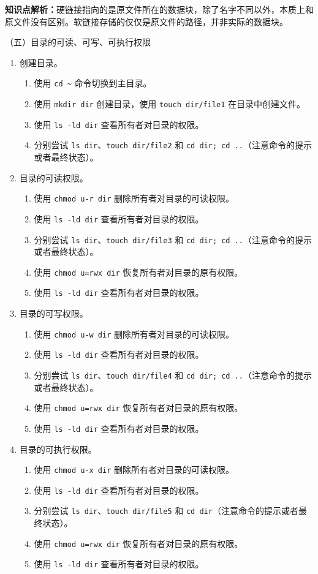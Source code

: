 \textbf{知识点解析：}硬链接指向的是原文件所在的数据块，除了名字不同以外，本质上和原文件没有区别。软链接存储的仅仅是原文件的路径，并非实际的数据块。

\vspace{0.1in}
（五）目录的可读、可写、可执行权限
\begin{enumerate}
  \item 创建目录。
    \begin{enumerate}
      \item 使用 \verb|cd ~| 命令切换到主目录。
      \item 使用 \verb|mkdir dir| 创建目录，使用 \verb|touch dir/file1| 在目录中创建文件。
      \item 使用 \verb|ls -ld dir| 查看所有者对目录的权限。
      \item 分别尝试 \verb|ls dir|、\verb|touch dir/file2| 和 \verb|cd dir; cd ..|（注意命令的提示或者最终状态）。
    \end{enumerate}
  \item 目录的可读权限。
    \begin{enumerate}
      \item 使用 \verb|chmod u-r dir| 删除所有者对目录的可读权限。
      \item 使用 \verb|ls -ld dir| 查看所有者对目录的权限。
      \item 分别尝试 \verb|ls dir|、\verb|touch dir/file3| 和 \verb|cd dir; cd ..|（注意命令的提示或者最终状态）。
      \item 使用 \verb|chmod u=rwx dir| 恢复所有者对目录的原有权限。
      \item 使用 \verb|ls -ld dir| 查看所有者对目录的权限。
    \end{enumerate}
  \item 目录的可写权限。
    \begin{enumerate}
      \item 使用 \verb|chmod u-w dir| 删除所有者对目录的可读权限。
      \item 使用 \verb|ls -ld dir| 查看所有者对目录的权限。
      \item 分别尝试 \verb|ls dir|、\verb|touch dir/file4| 和 \verb|cd dir; cd ..|（注意命令的提示或者最终状态）。
      \item 使用 \verb|chmod u=rwx dir| 恢复所有者对目录的原有权限。
      \item 使用 \verb|ls -ld dir| 查看所有者对目录的权限。
    \end{enumerate}
  \item 目录的可执行权限。
    \begin{enumerate}
      \item 使用 \verb|chmod u-x dir| 删除所有者对目录的可读权限。
      \item 使用 \verb|ls -ld dir| 查看所有者对目录的权限。
      \item 分别尝试 \verb|ls dir|、\verb|touch dir/file5| 和 \verb|cd dir|（注意命令的提示或者最终状态）。
      \item 使用 \verb|chmod u=rwx dir| 恢复所有者对目录的原有权限。
      \item 使用 \verb|ls -ld dir| 查看所有者对目录的权限。
    \end{enumerate}
\end{enumerate}

